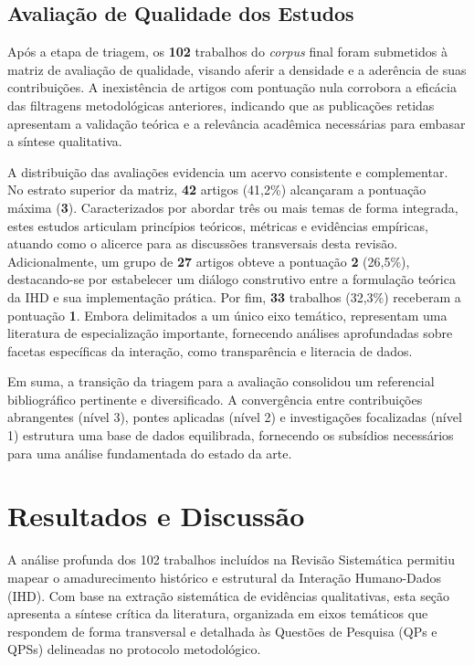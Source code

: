 \documentclass[12pt]{article}
\begin{document}
\subsection{Avaliação de Qualidade dos Estudos}

    Após a etapa de triagem, os \textbf{102} trabalhos do \textit{corpus} final foram submetidos à matriz de avaliação de qualidade, visando aferir a densidade e a aderência de suas contribuições. A inexistência de artigos com pontuação nula corrobora a eficácia das filtragens metodológicas anteriores, indicando que as publicações retidas apresentam a validação teórica e a relevância acadêmica necessárias para embasar a síntese qualitativa.

    A distribuição das avaliações evidencia um acervo consistente e complementar. No estrato superior da matriz, \textbf{42} artigos (41,2\%) alcançaram a pontuação máxima (\textbf{3}). Caracterizados por abordar três ou mais temas de forma integrada, estes estudos articulam princípios teóricos, métricas e evidências empíricas, atuando como o alicerce para as discussões transversais desta revisão. Adicionalmente, um grupo de \textbf{27} artigos obteve a pontuação \textbf{2} (26,5\%), destacando-se por estabelecer um diálogo construtivo entre a formulação teórica da IHD e sua implementação prática. Por fim, \textbf{33} trabalhos (32,3\%) receberam a pontuação \textbf{1}. Embora delimitados a um único eixo temático, representam uma literatura de especialização importante, fornecendo análises aprofundadas sobre facetas específicas da interação, como transparência e literacia de dados.

    Em suma, a transição da triagem para a avaliação consolidou um referencial bibliográfico pertinente e diversificado. A convergência entre contribuições abrangentes (nível 3), pontes aplicadas (nível 2) e investigações focalizadas (nível 1) estrutura uma base de dados equilibrada, fornecendo os subsídios necessários para uma análise fundamentada do estado da arte.

\section{Resultados e Discussão}

A análise profunda dos 102 trabalhos incluídos na Revisão Sistemática permitiu mapear o amadurecimento histórico e estrutural da Interação Humano-Dados (IHD). Com base na extração sistemática de evidências qualitativas, esta seção apresenta a síntese crítica da literatura, organizada em eixos temáticos que respondem de forma transversal e detalhada às Questões de Pesquisa (QPs e QPSs) delineadas no protocolo metodológico.
\end{document}

